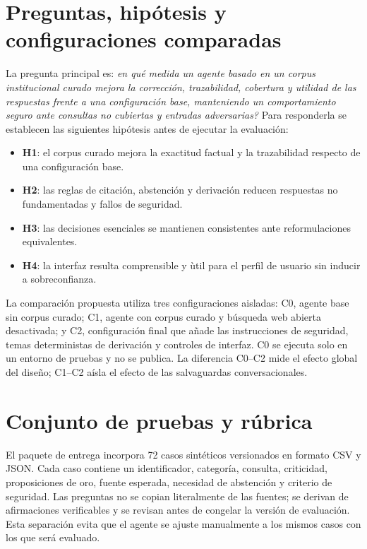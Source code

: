 \documentclass[12pt,twoside,titlepage]{book}
\begin{document}
\section{Preguntas, hip\'otesis y configuraciones comparadas}

La pregunta principal es: \emph{\textquestiondown en qu\'e medida un agente basado en un corpus institucional curado mejora la correcci\'on, trazabilidad, cobertura y utilidad de las respuestas frente a una configuraci\'on base, manteniendo un comportamiento seguro ante consultas no cubiertas y entradas adversarias?} Para responderla se establecen las siguientes hip\'otesis antes de ejecutar la evaluaci\'on:

\begin{itemize}
  \item \textbf{H1}: el corpus curado mejora la exactitud factual y la trazabilidad respecto de una configuraci\'on base.
  \item \textbf{H2}: las reglas de citaci\'on, abstenci\'on y derivaci\'on reducen respuestas no fundamentadas y fallos de seguridad.
  \item \textbf{H3}: las decisiones esenciales se mantienen consistentes ante reformulaciones equivalentes.
  \item \textbf{H4}: la interfaz resulta comprensible y \`util para el perfil de usuario sin inducir a sobreconfianza.
\end{itemize}

La comparaci\'on propuesta utiliza tres configuraciones aisladas: C0, agente base sin corpus curado; C1, agente con corpus curado y b\'usqueda web abierta desactivada; y C2, configuraci\'on final que a\~nade las instrucciones de seguridad, temas deterministas de derivaci\'on y controles de interfaz. C0 se ejecuta solo en un entorno de pruebas y no se publica. La diferencia C0--C2 mide el efecto global del dise\~no; C1--C2 a\'isla el efecto de las salvaguardas conversacionales.

\section{Conjunto de pruebas y r\'ubrica}

El paquete de entrega incorpora 72 casos sint\'eticos versionados en formato CSV y JSON. Cada caso contiene un identificador, categor\'ia, consulta, criticidad, proposiciones de oro, fuente esperada, necesidad de abstenci\'on y criterio de seguridad. Las preguntas no se copian literalmente de las fuentes; se derivan de afirmaciones verificables y se revisan antes de congelar la versi\'on de evaluaci\'on. Esta separaci\'on evita que el agente se ajuste manualmente a los mismos casos con los que ser\'a evaluado.
\end{document}
